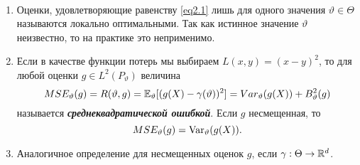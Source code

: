 \begin{rmrk} \
	\begin{enumerate}
		\item Оценки, удовлетворяющие равенству \eqref{eq2.1} лишь для одного значения $\vartheta \in \Theta$ называются локально оптимальными. Так как истинное значение $\vartheta$ неизвестно, то на практике это неприменимо. 
		\item Если в качестве функции потерь мы выбираем $L(x,y)=(x-y)^2$, то для любой оценки $g \in L^2(P_\vartheta)$ величина
		\[ MSE_\vartheta(g) = R(\vartheta, g)=\mathbb{E}_\vartheta[(g(X)-\gamma(\vartheta))^2]=Var_\vartheta(g(X))+B_\vartheta^2(g) \]
		называется \textbf{\textit{среднеквадратической ошибкой}}. Если $g$ несмещенная, то
		\[MSE_\vartheta(g)=\mathrm{Var}_\vartheta(g(X)). \]
		\item Аналогичное определение для несмещенных оценок $g$, если $\gamma: \Theta \rightarrow \mathbb{R}^d$.
	\end{enumerate}
\end{rmrk}

